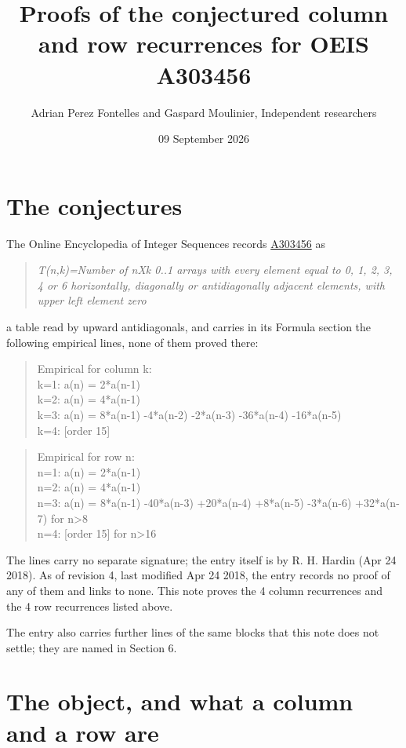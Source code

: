 \documentclass[11pt]{article}
\title{Proofs of the conjectured column and row recurrences for OEIS A303456}
\author{Adrian Perez Fontelles and Gaspard Moulinier, Independent researchers}
\date{09 September 2026}
\theoremstyle{definition}
\begin{document}
\maketitle
\section{The conjectures}

The Online Encyclopedia of Integer Sequences records \href{https://oeis.org/A303456}{A303456} as

\begin{quote}\itshape T(n,k)=Number of nXk 0..1 arrays with every element equal to 0, 1, 2, 3, 4 or 6 horizontally, diagonally or antidiagonally adjacent elements, with upper left element zero\end{quote}

a table read by upward antidiagonals, and carries in its Formula section the following empirical lines, none of them proved there:

\begin{quote}\ttfamily Empirical for column k:\\
k=1: a(n) = 2*a(n-1)\\k=2: a(n) = 4*a(n-1)\\k=3: a(n) = 8*a(n-1) -4*a(n-2) -2*a(n-3) -36*a(n-4) -16*a(n-5)\\k=4: [order 15]\end{quote}

\begin{quote}\ttfamily Empirical for row n:\\
n=1: a(n) = 2*a(n-1)\\n=2: a(n) = 4*a(n-1)\\n=3: a(n) = 8*a(n-1) -40*a(n-3) +20*a(n-4) +8*a(n-5) -3*a(n-6) +32*a(n-7) for n>8\\n=4: [order 15] for n>16\end{quote}

The lines carry no separate signature; the entry itself is by R. H. Hardin (Apr 24 2018). As of revision 4, last modified Apr 24 2018, the entry records no proof of any of them and links to none. This note proves the 4 column recurrences and the 4 row recurrences listed above.

The entry also carries further lines of the same blocks that this note does not settle; they are named in Section 6.

\section{The object, and what a column and a row are}
\end{document}
